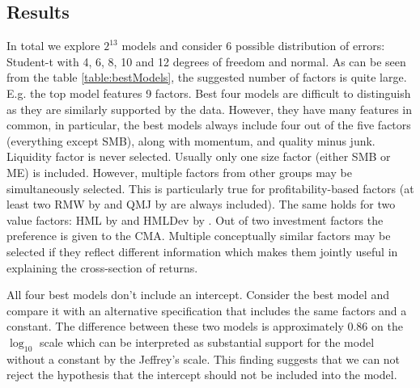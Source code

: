 \subsection{Results}
In total we explore $2^{13}$ models and consider 6 possible distribution of errors: Student-t with 4, 6, 8, 10 and 12 degrees of freedom and normal. 
As can be seen from the table \ref{table:bestModels}, the suggested number of factors is quite large. 
E.g. the top model features 9 factors. 
Best four models are difficult to distinguish as they are similarly supported by the data. 
However, they have many features in common, in particular, the best models always include four out of the five
\cite{fama2015five} factors (everything except SMB), along with momentum, and
quality minus junk. 
Liquidity factor \cite{stambaugh2003liquidity} is never selected.
Usually only one size factor (either SMB or ME) is included. 
However, multiple factors from other groups may be simultaneously selected.
This is particularly true for profitability-based factors (at least two RMW by \cite{fama2015five} and QMJ by \cite{asness2014quality} are always included). 
The same holds for two value factors: HML by \cite{fama2015five} and HMLDev by \cite{asness2013devil}. 
Out of two investment factors the preference is given to the \cite{fama2015five} CMA. 
Multiple conceptually similar factors may be selected if they reflect different information which makes them jointly useful in explaining the cross-section of returns.

All four best models don't include an intercept. 
Consider the best model and compare it with an alternative specification that includes the same factors and a constant.
The difference between these two models is approximately 0.86 on the $\log_{10}$ scale which can be interpreted as substantial support for the model without a constant by the Jeffrey's scale. 
This finding suggests that we can not reject the hypothesis that the intercept should not be included into the model.


